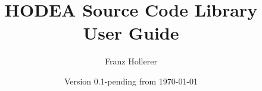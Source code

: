 \documentclass[a4paper]{report}
\begin{document}
\title{HODEA Source Code Library\\
User Guide}
\author{Franz Hollerer}
\date{Version 0.1-pending from \today}

\maketitle

\begin{versionhistory}
\end{versionhistory}

\tableofcontents

\end{document}

